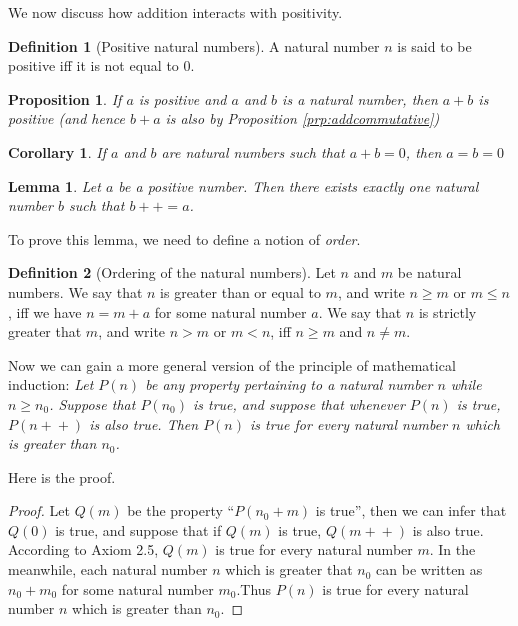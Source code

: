 \documentclass[
]{book}
\newtheorem{lemma}{Lemma}[chapter]
\newtheorem{corollary}{Corollary}[chapter]
\newtheorem{proposition}{Proposition}[chapter]
\theoremstyle{definition}
\newtheorem{definition}{Definition}[chapter]
\theoremstyle{definition}
\theoremstyle{definition}
\theoremstyle{definition}
\theoremstyle{remark}
\begin{document}
We now discuss how addition interacts with positivity.

\begin{definition}[Positive natural numbers]
\protect\hypertarget{def:positive}{}\label{def:positive}A natural number \(n\) is said to be positive iff it is not equal to 0.
\end{definition}

\begin{proposition}
If \(a\) is positive and \(a\) and \(b\) is a natural number, then \(a+b\) is positive (and hence \(b+a\) is also by Proposition \ref{prp:addcommutative})
\end{proposition}

\begin{corollary}
If \(a\) and \(b\) are natural numbers such that \(a+b=0\), then \(a=b=0\)
\end{corollary}

\begin{lemma}
\protect\hypertarget{lem:b}{}\label{lem:b}Let \(a\) be a positive number. Then there exists exactly one natural number \(b\) such that \(b+\!\!+ = a\).
\end{lemma}

To prove this lemma, we need to define a notion of \emph{order}.

\begin{definition}[Ordering of the natural numbers]
\protect\hypertarget{def:order}{}\label{def:order}Let \(n\) and \(m\) be natural numbers. We say that \(n\) is greater than or equal to \(m\), and write \(n \geq m\) or \(m \leq n\), iff we have \(n = m+a\) for some natural number \(a\). We say that \(n\) is strictly greater that \(m\), and write \(n>m\) or \(m<n\), iff \(n\geq m\) and \(n \ne m\).
\end{definition}

Now we can gain a more general version of the principle of mathematical induction: \emph{Let \(P(n)\) be any property pertaining to a natural number \(n\) while \(n \geq n_0\). Suppose that \(P(n_0)\) is true, and suppose that whenever \(P(n)\) is true, \(P(n+\!\!+)\) is also true. Then \(P(n)\) is true for every natural number \(n\) which is greater than \(n_0\).}

Here is the proof.

\begin{proof}
Let \(Q(m)\) be the property ``\(P(n_0+m)\) is true'', then we can infer that \(Q(0)\) is true, and suppose that if \(Q(m)\) is true, \(Q(m+\!\!+)\) is also true. According to Axiom 2.5, \(Q(m)\) is true for every natural number \(m\). In the meanwhile, each natural number \(n\) which is greater that \(n_0\) can be written as \(n_0+m_0\) for some natural number \(m_0\).Thus \(P(n)\) is true for every natural number \(n\) which is greater than \(n_0\).
\end{proof}
\end{document}

